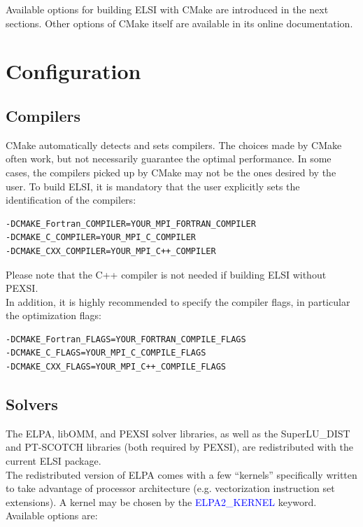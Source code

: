 \documentclass{report}
\begin{document}
Available options for building ELSI with CMake are introduced in the next sections.  Other options of CMake itself are available in its online documentation.\\

\section{Configuration}
\label{sec:config}
\subsection{Compilers}
\label{subsec:config_compilers}
CMake automatically detects and sets compilers.  The choices made by CMake often work, but not necessarily guarantee the optimal performance.  In some cases, the compilers picked up by CMake may not be the ones desired by the user.  To build ELSI, it is mandatory that the user explicitly sets the identification of the compilers:\\

\begin{verbatim}
-DCMAKE_Fortran_COMPILER=YOUR_MPI_FORTRAN_COMPILER
-DCMAKE_C_COMPILER=YOUR_MPI_C_COMPILER
-DCMAKE_CXX_COMPILER=YOUR_MPI_C++_COMPILER
\end{verbatim}

Please note that the C++ compiler is not needed if building ELSI without PEXSI.\\

In addition, it is highly recommended to specify the compiler flags, in particular the optimization flags:\\

\begin{verbatim}
-DCMAKE_Fortran_FLAGS=YOUR_FORTRAN_COMPILE_FLAGS
-DCMAKE_C_FLAGS=YOUR_MPI_C_COMPILE_FLAGS
-DCMAKE_CXX_FLAGS=YOUR_MPI_C++_COMPILE_FLAGS
\end{verbatim}

\subsection{Solvers}
\label{subsec:config_solvers}
The ELPA, libOMM, and PEXSI solver libraries, as well as the SuperLU\_DIST and PT-SCOTCH libraries (both required by PEXSI), are redistributed with the current ELSI package.\\

The redistributed version of ELPA comes with a few ``kernels'' specifically written to take advantage of processor architecture (e.g. vectorization instruction set extensions).  A kernel may be chosen by the \textcolor{blue}{ELPA2\_KERNEL} keyword.  Available options are:\\
\end{document}
